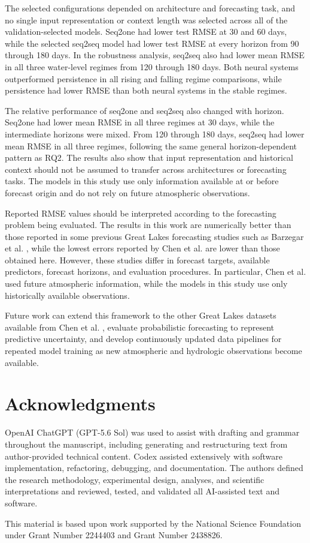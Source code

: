 \documentclass[conference]{IEEEtran}
\begin{document}
The selected configurations depended on architecture and forecasting task, and no single input representation or context length was selected across all of the validation-selected models. Seq2one had lower test RMSE at 30 and 60 days, while the selected seq2seq model had lower test RMSE at every horizon from 90 through 180 days. In the robustness analysis, seq2seq also had lower mean RMSE in all three water-level regimes from 120 through 180 days. Both neural systems outperformed persistence in all rising and falling regime comparisons, while persistence had lower RMSE than both neural systems in the stable regimes.

The relative performance of seq2one and seq2seq also changed with horizon. Seq2one had lower mean RMSE in all three regimes at 30 days, while the intermediate horizons were mixed. From 120 through 180 days, seq2seq had lower mean RMSE in all three regimes, following the same general horizon-dependent pattern as RQ2. The results also show that input representation and historical context should not be assumed to transfer across architectures or forecasting tasks. The models in this study use only information available at or before forecast origin and do not rely on future atmospheric observations.

Reported RMSE values should be interpreted according to the forecasting problem being evaluated. The results in this work are numerically better than those reported in some previous Great Lakes forecasting studies such as Barzegar et al. \cite{barzegar2021cnn}, while the lowest errors reported by Chen et al. \cite{chen2025dualtransformer} are lower than those obtained here. However, these studies differ in forecast targets, available predictors, forecast horizons, and evaluation procedures. In particular, Chen et al. used future atmospheric information, while the models in this study use only historically available observations.

Future work can extend this framework to the other Great Lakes datasets available from Chen et al. \cite{chen2025dualtransformer}, evaluate probabilistic forecasting to represent predictive uncertainty, and develop continuously updated data pipelines for repeated model training as new atmospheric and hydrologic observations become available.


\section*{Acknowledgments}

OpenAI ChatGPT (GPT-5.6 Sol) was used to assist with drafting and grammar throughout the manuscript, including generating and restructuring text from author-provided technical content. Codex assisted extensively with software implementation, refactoring, debugging, and documentation. The authors defined the research methodology, experimental design, analyses, and scientific interpretations and reviewed, tested, and validated all AI-assisted text and software.

This material is based upon work supported by the National Science Foundation under Grant Number 2244403 and Grant Number 2438826.

\newpage



\end{document}
